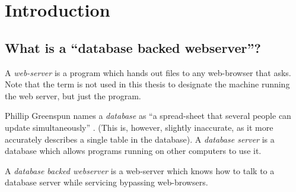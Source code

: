 
\chapter{Introduction}





\section{What is a ``database backed webserver''?}

A \textit{web-server} is a program which hands out files to any
web-browser that asks.  Note that the term is not used in this thesis
to designate the machine running the web server, but just the program.

Phillip Greenspun names a \textit{database} as ``a spread-sheet that
several people can update simultaneously''
\cite{phillipandalexsguidetowebpublishing}.  (This is, however,
slightly inaccurate, as it more accurately describes a single table in
the database).  A \textit{database server} is a database which allows
programs running on other computers to use it.

A \textit{database backed webserver} is a web-server which knows how
to talk to a database server while servicing bypassing web-browsers.







